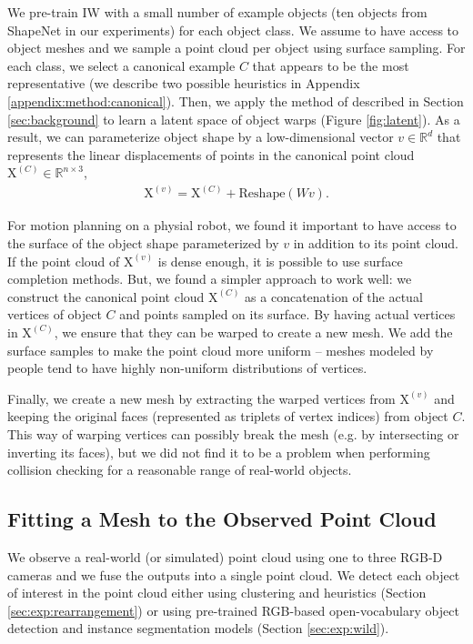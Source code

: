 \documentclass{article}
\newcommand{\pcx}[1]{\mathrm{X}^{(#1)}}
\newcommand{\pcc}{\pcx{C}}
\begin{document}
We pre-train IW with a small number of example objects (ten objects from ShapeNet \cite{chang15shapenet} in our experiments) for each object class. We assume to have access to object meshes and we sample a point cloud per object using surface sampling. For each class, we select a canonical example $C$ that appears to be the most representative (we describe two possible heuristics in Appendix \ref{appendix:method:canonical}). Then, we apply the method of \cite{rodriguez18transferring} described in Section \ref{sec:background} to learn a latent space of object warps (Figure \ref{fig:latent}). As a result, we can parameterize object shape by a low-dimensional vector $v \in \mathbb{R}^d$ that represents the linear displacements of points in the canonical point cloud $\pcc \in \mathbb{R}^{n \times 3}$,
\begin{align}
    \pcx{v} = \pcc + \mathrm{Reshape}(W v). \label{eq:warp}
\end{align}

For motion planning on a physial robot, we found it important to have access to the surface of the object shape parameterized by $v$ in addition to its point cloud. If the point cloud of $\pcx{v}$ is dense enough, it is possible to use surface completion methods. But, we found a simpler approach to work well: we construct the canonical point cloud $\pcc$ as a concatenation of the actual vertices of object $C$ and points sampled on its surface. By having actual vertices in $\pcc$, we ensure that they can be warped to create a new mesh. We add the surface samples to make the point cloud more uniform -- meshes modeled by people tend to have highly non-uniform distributions of vertices.

Finally, we create a new mesh by extracting the warped vertices from $\pcx{v}$ and keeping the original faces (represented as triplets of vertex indices) from object $C$. This way of warping vertices can possibly break the mesh (e.g. by intersecting or inverting its faces), but we did not find it to be a problem when performing collision checking for a reasonable range of real-world objects.

\subsection{Fitting a Mesh to the Observed Point Cloud}
\label{sec:methods:scene}

We observe a real-world (or simulated) point cloud using one to three RGB-D cameras and we fuse the outputs into a single point cloud. We detect each object of interest in the point cloud either using clustering and heuristics (Section \ref{sec:exp:rearrangement}) or using pre-trained RGB-based open-vocabulary object detection and instance segmentation models (Section \ref{sec:exp:wild}).
\end{document}
